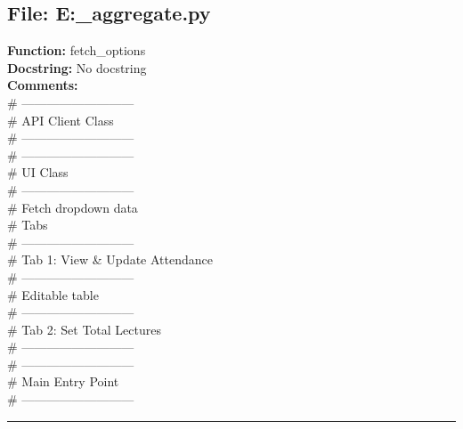 {\subsection*{File: E:\project\capstone\frontend\faculty\attendance_aggregate.py}
\textbf{Function:} fetch_options\\
\textbf{Docstring:} No docstring\\
\textbf{Comments:}\\
# ---------------------------\\
# API Client Class\\
# ---------------------------\\
# ---------------------------\\
# UI Class\\
# ---------------------------\\
# Fetch dropdown data\\
# Tabs\\
# ---------------------------\\
# Tab 1: View & Update Attendance\\
# ---------------------------\\
# Editable table\\
# ---------------------------\\
# Tab 2: Set Total Lectures\\
# ---------------------------\\
# ---------------------------\\
# Main Entry Point\\
# ---------------------------\\

\hrule

}
